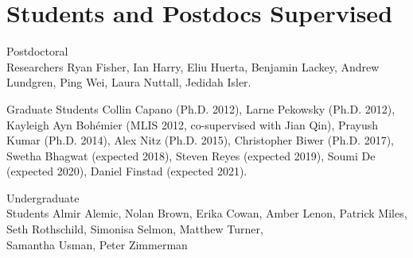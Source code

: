 \documentclass{cv}
\begin{document}
\section{Students and Postdocs Supervised}
\begin{entry}
\item[Postdoctoral \\Researchers] {Ryan Fisher, Ian Harry, Eliu Huerta, Benjamin Lackey, Andrew Lundgren, Ping Wei, Laura Nuttall, Jedidah Isler.}

\item[Graduate Students] {Collin Capano (Ph.D. 2012), Larne Pekowsky (Ph.D. 2012), Kayleigh Ayn Boh\'emier (MLIS 2012, co-supervised with Jian Qin), Prayush Kumar (Ph.D. 2014), 
Alex Nitz (Ph.D. 2015), Christopher Biwer (Ph.D. 2017), Swetha Bhagwat (expected 2018), Steven Reyes (expected 2019), Soumi De (expected 2020), Daniel Finstad (expected 2021).}\\

\item[Undergraduate \\Students] {Almir Alemic, Nolan Brown, Erika Cowan, Amber Lenon, Patrick Miles, Seth Rothschild, Simonisa Selmon, Matthew Turner, \\ Samantha Usman, Peter Zimmerman}\\
\end{entry}
\end{document}
